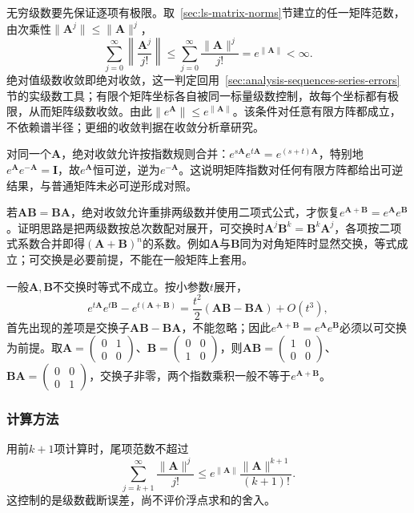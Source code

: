 无穷级数要先保证逐项有极限。取~\ref{sec:ls-matrix-norms}节建立的任一矩阵范数，由次乘性$\lVert\bm A^j\rVert\leq\lVert\bm A\rVert^j$，
\[
 \sum_{j=0}^{\infty}\left\lVert\frac{\bm A^j}{j!}\right\rVert
 \leq\sum_{j=0}^{\infty}\frac{\lVert\bm A\rVert^j}{j!}
 =e^{\lVert\bm A\rVert}<\infty.
\]
绝对值级数收敛即绝对收敛，这一判定回用~\ref{sec:analysis-sequences-series-errors}节的实级数工具；有限个矩阵坐标各自被同一标量级数控制，故每个坐标都有极限，从而矩阵级数收敛。由此$\lVert e^{\bm A}\rVert\leq e^{\lVert\bm A\rVert}$。该条件对任意有限方阵都成立，不依赖谱半径；更细的收敛判据在收敛分析章研究。

对同一个$\bm A$，绝对收敛允许按指数规则合并：$e^{s\bm A}e^{t\bm A}=e^{(s+t)\bm A}$，特别地$e^{\bm A}e^{-\bm A}=\bm I$，故$e^{\bm A}$恒可逆，逆为$e^{-\bm A}$。这说明矩阵指数对任何有限方阵都给出可逆结果，与普通矩阵未必可逆形成对照。

若$\bm A\bm B=\bm B\bm A$，绝对收敛允许重排两级数并使用二项式公式，才恢复$e^{\bm A+\bm B}=e^{\bm A}e^{\bm B}$。证明思路是把两级数按总次数配对展开，可交换时$\bm A^j\bm B^k=\bm B^k\bm A^j$，各项按二项式系数合并即得$( \bm A+\bm B)^n$的系数。例如$\bm A$与$\bm B$同为对角矩阵时显然交换，等式成立；可交换是必要前提，不能在一般矩阵上套用。

一般$\bm A,\bm B$不交换时等式不成立。按小参数$t$展开，
\[
 e^{t\bm A}e^{t\bm B}-e^{t(\bm A+\bm B)}
 =\frac{t^2}{2}(\bm A\bm B-\bm B\bm A)+O(t^3),
\]
首先出现的差项是交换子$\bm A\bm B-\bm B\bm A$，不能忽略；因此$e^{\bm A+\bm B}=e^{\bm A}e^{\bm B}$必须以可交换为前提。取$\bm A=\begin{pmatrix}0&1\\0&0\end{pmatrix}$、$\bm B=\begin{pmatrix}0&0\\1&0\end{pmatrix}$，则$\bm A\bm B=\begin{pmatrix}1&0\\0&0\end{pmatrix}$、$\bm B\bm A=\begin{pmatrix}0&0\\0&1\end{pmatrix}$，交换子非零，两个指数乘积一般不等于$e^{\bm A+\bm B}$。

\subsubsection{计算方法}

用前$k+1$项计算时，尾项范数不超过
\[
 \sum_{j=k+1}^{\infty}\frac{\lVert\bm A\rVert^j}{j!}
 \leq e^{\lVert\bm A\rVert}\frac{\lVert\bm A\rVert^{k+1}}{(k+1)!}.
\]
这控制的是级数截断误差，尚不评价浮点求和的舍入。

